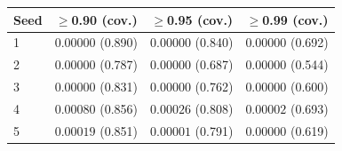 \footnotesize
\setlength{\tabcolsep}{2.5pt}
\begin{tabular}{lccc}
\toprule
Seed & $\ge$0.90 (cov.) & $\ge$0.95 (cov.) & $\ge$0.99 (cov.) \\
\midrule
1 & $0.00000$ (0.890) & $0.00000$ (0.840) & $0.00000$ (0.692) \\
2 & $0.00000$ (0.787) & $0.00000$ (0.687) & $0.00000$ (0.544) \\
3 & $0.00000$ (0.831) & $0.00000$ (0.762) & $0.00000$ (0.600) \\
4 & $0.00080$ (0.856) & $0.00026$ (0.808) & $0.00002$ (0.693) \\
5 & $0.00019$ (0.851) & $0.00001$ (0.791) & $0.00000$ (0.619) \\
\bottomrule
\end{tabular}
